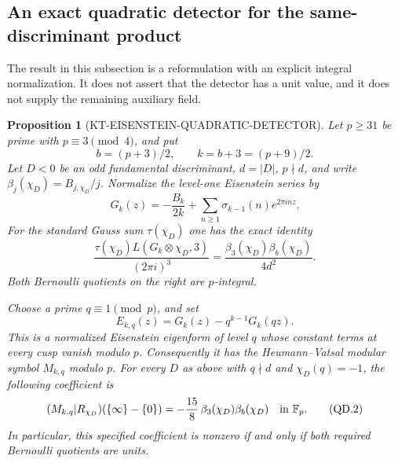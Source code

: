 \documentclass[11pt,a4paper]{article}
\newtheorem{proposition}[theorem]{Proposition}
\theoremstyle{definition}
\begin{document}
\subsection{An exact quadratic detector for the same-discriminant product}

The result in this subsection is a reformulation with an explicit integral
normalization.  It does not assert that the detector has a unit value,
and it does not supply the remaining auxiliary field.

\begin{proposition}[KT-EISENSTEIN-QUADRATIC-DETECTOR]
Let $p\geq31$ be prime with $p\equiv3\pmod4$, and put
\[
 b=(p+3)/2,\qquad k=b+3=(p+9)/2.
\]
Let $D<0$ be an odd fundamental discriminant, $d=|D|$, $p\nmid d$,
and write $\beta_j(\chi_D)=B_{j,\chi_D}/j$.  Normalize the level-one
Eisenstein series by
\[
 G_k(z)=-\frac{B_k}{2k}+\sum_{n\geq1}\sigma_{k-1}(n)e^{2\pi inz}.
\]
For the standard Gauss sum $\tau(\chi_D)$ one has the exact identity
\begin{equation}
 \frac{\tau(\chi_D)L(G_k\otimes\chi_D,3)}{(2\pi i)^3}
       =\frac{\beta_3(\chi_D)\beta_b(\chi_D)}{4d^2}.
 \tag{QD.1}
\end{equation}
Both Bernoulli quotients on the right are $p$-integral.

Choose a prime $q\equiv1\pmod p$, and set
\[
 E_{k,q}(z)=G_k(z)-q^{k-1}G_k(qz).
\]
This is a normalized Eisenstein eigenform of level $q$ whose constant
terms at every cusp vanish modulo $p$.  Consequently it has the
Heumann--Vatsal modular symbol $M_{k,q}$ modulo $p$.  For every $D$ as
above with $q\nmid d$ and $\chi_D(q)=-1$, the following coefficient is
\begin{equation}
 [X^2Y^{k-4}](M_{k,q}|R_{\chi_D})(\{\infty\}-\{0\})
       =-\frac{15}{8}\,\beta_3(\chi_D)\beta_b(\chi_D)
          \quad\hbox{in }\mathbb F_p.
 \tag{QD.2}
\end{equation}
In particular, this specified coefficient is nonzero if and only if both
required Bernoulli quotients are units.
\end{proposition}
\end{document}

